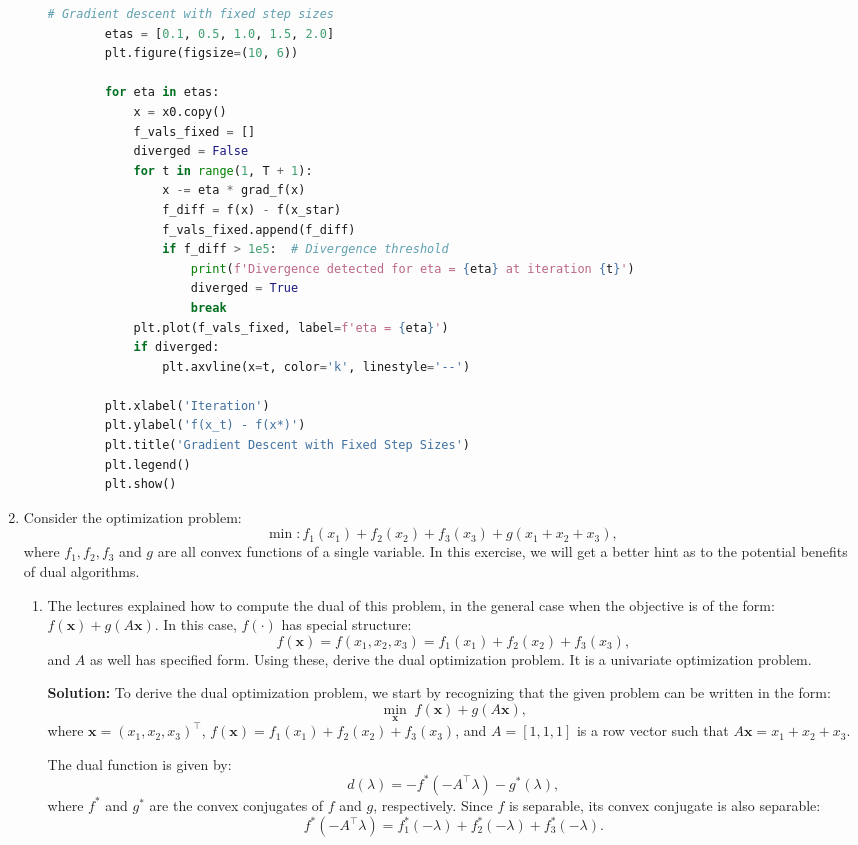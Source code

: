 \documentclass{article}
\begin{document}
\begin{enumerate}
\begin{enumerate}
\begin{lstlisting}[language=Python, breaklines=true]
        # Gradient descent with fixed step sizes
        etas = [0.1, 0.5, 1.0, 1.5, 2.0]
        plt.figure(figsize=(10, 6))

        for eta in etas:
            x = x0.copy()
            f_vals_fixed = []
            diverged = False
            for t in range(1, T + 1):
                x -= eta * grad_f(x)
                f_diff = f(x) - f(x_star)
                f_vals_fixed.append(f_diff)
                if f_diff > 1e5:  # Divergence threshold
                    print(f'Divergence detected for eta = {eta} at iteration {t}')
                    diverged = True
                    break
            plt.plot(f_vals_fixed, label=f'eta = {eta}')
            if diverged:
                plt.axvline(x=t, color='k', linestyle='--')

        plt.xlabel('Iteration')
        plt.ylabel('f(x_t) - f(x*)')
        plt.title('Gradient Descent with Fixed Step Sizes')
        plt.legend()
        plt.show()
        \end{lstlisting}
    \end{enumerate}
    
    \item Consider the optimization problem:
    \[
    \min : f_1(x_1) + f_2(x_2) + f_3(x_3) + g(x_1 + x_2 + x_3),
    \]
    where $f_1, f_2, f_3$ and $g$ are all convex functions of a single variable. In this exercise, we will get a better hint as to the potential benefits of dual algorithms.
    \begin{enumerate}
        \item The lectures explained how to compute the dual of this problem, in the general case when the objective is of the form: $f(\mathbf{x}) + g(A\mathbf{x})$. In this case, $f(\cdot)$ has special structure:
        \[
        f(\mathbf{x}) = f(x_1, x_2, x_3) = f_1(x_1) + f_2(x_2) + f_3(x_3),
        \]
        and $A$ as well has specified form. Using these, derive the dual optimization problem. It is a univariate optimization problem.
        
        \textbf{Solution:} To derive the dual optimization problem, we start by recognizing that the given problem can be written in the form:
        \[
        \min_{\mathbf{x}} \; f(\mathbf{x}) + g(A\mathbf{x}),
        \]
        where $\mathbf{x} = (x_1, x_2, x_3)^\top$, $f(\mathbf{x}) = f_1(x_1) + f_2(x_2) + f_3(x_3)$, and $A = [1, 1, 1]$ is a row vector such that $A\mathbf{x} = x_1 + x_2 + x_3$.

        The dual function is given by:
        \[
        d(\lambda) = -f^*(-A^\top \lambda) - g^*(\lambda),
        \]
        where $f^*$ and $g^*$ are the convex conjugates of $f$ and $g$, respectively. Since $f$ is separable, its convex conjugate is also separable:
        \[
        f^*(-A^\top \lambda) = f_1^*(-\lambda) + f_2^*(-\lambda) + f_3^*(-\lambda).
        \]


\end{enumerate}
\end{enumerate}
\end{document}
